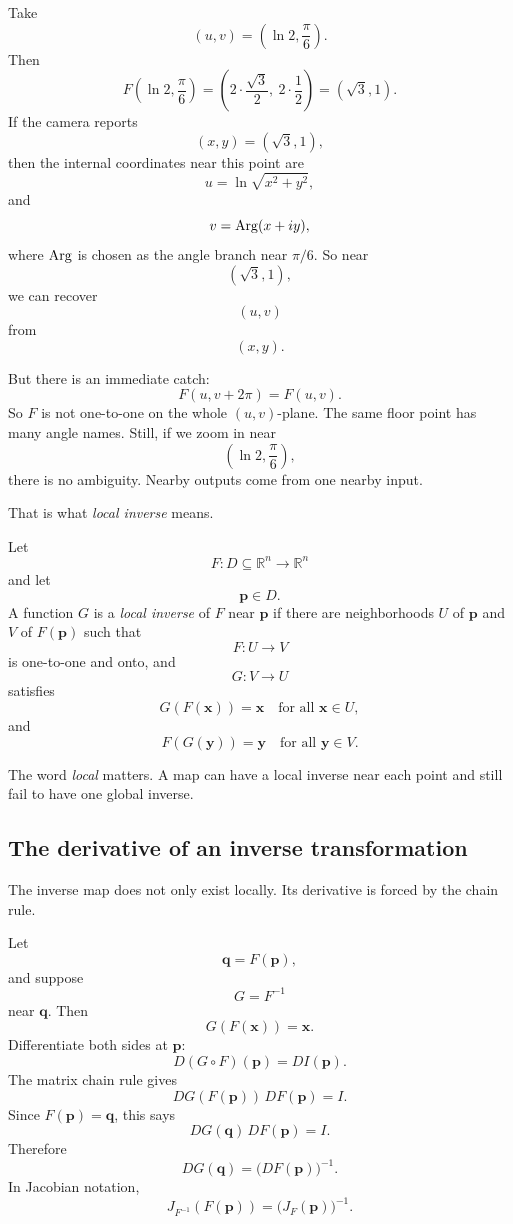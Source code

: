 Take
\[
    (u,v)=\left(\ln 2,\frac{\pi}{6}\right).
\]
Then
\[
    F\left(\ln 2,\frac{\pi}{6}\right)
    =
    \left(2\cdot\frac{\sqrt3}{2},\ 2\cdot\frac12\right)
    =
    (\sqrt3,1).
\]
If the camera reports
\[
    (x,y)=(\sqrt3,1),
\]
then the internal coordinates near this point are
\[
    u=\ln\sqrt{x^2+y^2},
\]
and
\[
    v=\operatorname{Arg}(x+iy),
\]
where \(\operatorname{Arg}\) is chosen as the angle branch near \(\pi/6\).  So near
\[
    (\sqrt3,1),
\]
we can recover
\[
    (u,v)
\]
from
\[
    (x,y).
\]

But there is an immediate catch:
\[
    F(u,v+2\pi)=F(u,v).
\]
So \(F\) is not one-to-one on the whole \((u,v)\)-plane.  The same floor point has
many angle names.  Still, if we zoom in near
\[
    \left(\ln2,\frac{\pi}{6}\right),
\]
there is no ambiguity.  Nearby outputs come from one nearby input.

That is what \emph{local inverse} means.

\begin{definition}
Let
\[
    F:D\subseteq\mathbb R^n\to\mathbb R^n
\]
and let
\[
    \mathbf p\in D.
\]
A function \(G\) is a \emph{local inverse} of \(F\) near \(\mathbf p\) if there are
neighborhoods \(U\) of \(\mathbf p\) and \(V\) of \(F(\mathbf p)\) such that
\[
    F:U\to V
\]
is one-to-one and onto, and
\[
    G:V\to U
\]
satisfies
\[
    G(F(\mathbf x))=\mathbf x
    \quad\text{for all }\mathbf x\in U,
\]
and
\[
    F(G(\mathbf y))=\mathbf y
    \quad\text{for all }\mathbf y\in V.
\]
\end{definition}

The word \emph{local} matters.  A map can have a local inverse near each point and
still fail to have one global inverse.

\subsection{The derivative of an inverse transformation}

The inverse map does not only exist locally.  Its derivative is forced by the chain rule.

Let
\[
    \mathbf q=F(\mathbf p),
\]
and suppose
\[
    G=F^{-1}
\]
near \(\mathbf q\).  Then
\[
    G(F(\mathbf x))=\mathbf x.
\]
Differentiate both sides at \(\mathbf p\):
\[
    D(G\circ F)(\mathbf p)=D I(\mathbf p).
\]
The matrix chain rule gives
\[
    DG(F(\mathbf p))\,DF(\mathbf p)=I.
\]
Since \(F(\mathbf p)=\mathbf q\), this says
\[
    DG(\mathbf q)\,DF(\mathbf p)=I.
\]
Therefore
\[
\boxed{
    DG(\mathbf q)=\bigl(DF(\mathbf p)\bigr)^{-1}.
}
\]
In Jacobian notation,
\[
\boxed{
    J_{F^{-1}}(F(\mathbf p))
    =
    \bigl(J_F(\mathbf p)\bigr)^{-1}.
}
\]

